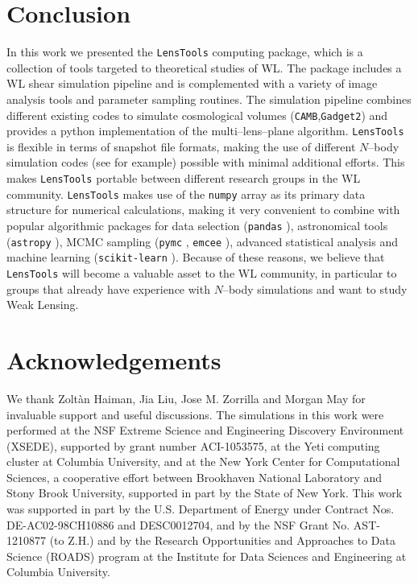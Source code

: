 \documentclass[5p]{elsarticle}
\newcommand{\ttt}[1]{\texttt{#1}}
\newcommand{\LT}{\texttt{LensTools} }
\begin{document}
\section{Conclusion}
%
In this work we presented the \LT computing package, which is a collection of tools targeted to theoretical studies of WL. The package includes a WL shear simulation pipeline and is complemented with a variety of image analysis tools and parameter sampling routines. The simulation pipeline combines different existing codes to simulate cosmological volumes (\ttt{CAMB},\ttt{Gadget2}) and provides a {\sc python} implementation of the multi--lens--plane algorithm. \LT is flexible in terms of snapshot file formats, making the use of different $N$--body simulation codes (see \citep{HACC} for example) possible with minimal additional efforts. This makes \LT portable between different research groups in the WL community. \LT makes use of the \ttt{numpy} array as its primary data structure for numerical calculations, making it very convenient to combine with popular algorithmic packages for data selection (\ttt{pandas} \citep{pandas}), astronomical tools (\ttt{astropy} \citep{astropy}), MCMC sampling (\ttt{pymc} \citep{pymc}, \ttt{emcee} \citep{emcee}), advanced statistical analysis and machine learning (\ttt{scikit-learn} \citep{scikit-learn}). Because of these reasons, we believe that \LT will become a valuable asset to the WL community, in particular to groups that already have experience with $N$--body simulations and want to study Weak Lensing.    


 

\section*{Acknowledgements}
We thank Zolt\`an Haiman, Jia Liu, Jose M. Zorrilla and Morgan May for invaluable support and useful discussions. The simulations in this work were performed at the NSF Extreme Science and Engineering Discovery Environment (XSEDE), supported by grant number ACI-1053575, at the Yeti computing cluster at Columbia University, and at the New York Center for Computational Sciences, a cooperative effort between Brookhaven National Laboratory and Stony Brook University, supported in part by the State of New York. This work was supported in part by the U.S. Department of Energy under Contract Nos. DE-AC02-98CH10886 and DESC0012704, and by the NSF Grant No. AST-1210877 (to Z.H.) and by the Research Opportunities and Approaches to Data Science (ROADS) program at the Institute for Data Sciences and Engineering at Columbia University. 



\label{lastpage}
\end{document}
